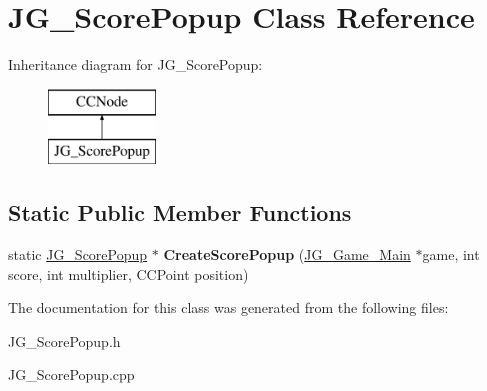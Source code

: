 \hypertarget{class_j_g___score_popup}{\section{J\-G\-\_\-\-Score\-Popup Class Reference}
\label{class_j_g___score_popup}
}
Inheritance diagram for J\-G\-\_\-\-Score\-Popup\-:\begin{figure}[H]
\begin{center}
\leavevmode
\includegraphics[height=2.000000cm]{class_j_g___score_popup}
\end{center}
\end{figure}
\subsection*{Static Public Member Functions}
\begin{DoxyCompactItemize}
\item 
\hypertarget{class_j_g___score_popup_ac083664691cd0f959bd50cfee59b1867}{static \hyperlink{class_j_g___score_popup}{J\-G\-\_\-\-Score\-Popup} $\ast$ {\bfseries Create\-Score\-Popup} (\hyperlink{class_j_g___game___main}{J\-G\-\_\-\-Game\-\_\-\-Main} $\ast$game, int score, int multiplier, C\-C\-Point position)}\label{class_j_g___score_popup_ac083664691cd0f959bd50cfee59b1867}

\end{DoxyCompactItemize}


The documentation for this class was generated from the following files\-:\begin{DoxyCompactItemize}
\item 
J\-G\-\_\-\-Score\-Popup.\-h\item 
J\-G\-\_\-\-Score\-Popup.\-cpp\end{DoxyCompactItemize}
